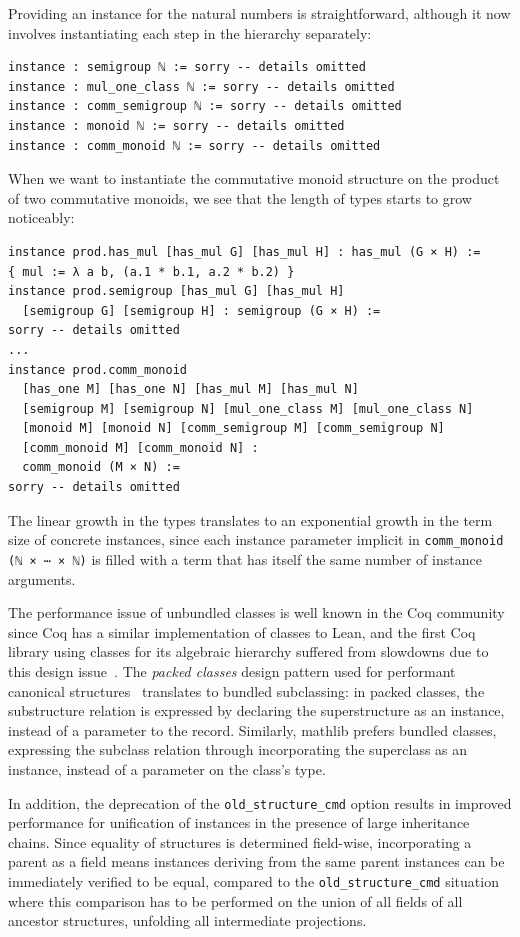 \documentclass[a4paper,UKenglish,cleveref, autoref, thm-restate]{lipics-v2021}
\newcommand{\mathlib}{\textsf{mathlib}\xspace}
\begin{document}
Providing an instance for the natural numbers is straightforward, although it now involves instantiating each step in the hierarchy separately:
\begin{lstlisting}
instance : semigroup ℕ := sorry -- details omitted
instance : mul_one_class ℕ := sorry -- details omitted
instance : comm_semigroup ℕ := sorry -- details omitted
instance : monoid ℕ := sorry -- details omitted
instance : comm_monoid ℕ := sorry -- details omitted
\end{lstlisting}

When we want to instantiate the commutative monoid structure on the product of two commutative monoids, we see that the length of types starts to grow noticeably:
\begin{lstlisting}
instance prod.has_mul [has_mul G] [has_mul H] : has_mul (G × H) :=
{ mul := λ a b, (a.1 * b.1, a.2 * b.2) }
instance prod.semigroup [has_mul G] [has_mul H]
  [semigroup G] [semigroup H] : semigroup (G × H) :=
sorry -- details omitted
...
instance prod.comm_monoid
  [has_one M] [has_one N] [has_mul M] [has_mul N]
  [semigroup M] [semigroup N] [mul_one_class M] [mul_one_class N]
  [monoid M] [monoid N] [comm_semigroup M] [comm_semigroup N]
  [comm_monoid M] [comm_monoid N] :
  comm_monoid (M × N) :=
sorry -- details omitted
\end{lstlisting}

The linear growth in the types translates to an exponential growth in the term size of concrete instances,
since each instance parameter implicit in \lstinline{comm_monoid (ℕ × ⋯ × ℕ)} is filled with a term that has itself the same number of instance arguments.

The performance issue of unbundled classes is well known in the Coq community since Coq has a similar implementation of classes to Lean,
and the first Coq library using classes for its algebraic hierarchy suffered from slowdowns due to this design issue~\cite{Coq-typeclass-hierarchy}.
The \emph{packed classes} design pattern used for performant canonical structures~\cite{Coq-Packed-classes} translates to bundled subclassing:
in packed classes, the substructure relation is expressed by declaring the superstructure as an instance, instead of a parameter to the record.
Similarly, \mathlib prefers bundled classes, expressing the subclass relation through incorporating the superclass as an instance, instead of a parameter on the class's type.

In addition, the deprecation of the \lstinline{old_structure_cmd} option results in improved performance for unification of instances in the presence of large inheritance chains.
Since equality of structures is determined field-wise, incorporating a parent as a field means instances deriving from the same parent instances can be immediately verified to be equal,
compared to the \lstinline{old_structure_cmd} situation where this comparison has to be performed on the union of all fields of all ancestor structures, unfolding all intermediate projections.
\end{document}
